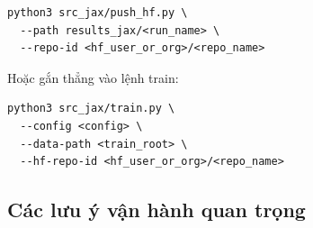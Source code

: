 \begin{lstlisting}[style=rae]
python3 src_jax/push_hf.py \
  --path results_jax/<run_name> \
  --repo-id <hf_user_or_org>/<repo_name>
\end{lstlisting}

Hoặc gắn thẳng vào lệnh train:

\begin{lstlisting}[style=rae]
python3 src_jax/train.py \
  --config <config> \
  --data-path <train_root> \
  --hf-repo-id <hf_user_or_org>/<repo_name>
\end{lstlisting}

\subsection{Các lưu ý vận hành quan trọng}

